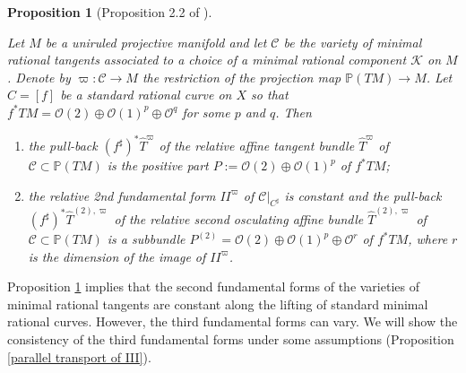 \documentclass[12pt]{amsart}
\theoremstyle{plain}
\newtheorem{proposition}[theorem]{Proposition}
\theoremstyle{definition}
\begin{document}
\begin{proposition} [Proposition 2.2 of \cite{Mk08}] \label{parallel transport of II}

Let $M$ be a uniruled projective manifold and let  $ \mathcal C$ be the variety of minimal rational tangents associated to a choice of a minimal rational component $\mathcal K$ on $M$. Denote by $\varpi: \mathcal C \rightarrow M$   the restriction of the projection map $\mathbb P(TM) \rightarrow M$.
Let $C=[f]$ be a standard rational curve on $X$ so that $f^*TM =\mathcal O(2) \oplus \mathcal O(1)^p \oplus \mathcal O^q$ for some $p$ and $q$.
Then
\begin{enumerate}
\item the pull-back $(f^{\sharp})^*\widehat{T}^{\varpi} $ of the relative affine tangent bundle $ \widehat{T}^{\varpi} $ of $\mathcal C \subset \mathbb P(TM)$ is the positive part $ P:=\mathcal O(2) \oplus \mathcal O(1)^p$ of $f^*TM$;
\item the relative 2nd fundamental form $II^{\varpi}$ of $\mathcal C|_{C^{\sharp}}$ is constant and  the pull-back $(f^{\sharp})^*\widehat{T}^{(2), \varpi} $ of the relative  second osculating affine   bundle   $ \widehat{T}^{(2), \varpi} $ of $\mathcal C \subset \mathbb P(TM)$  is a subbundle  $P^{(2)} =\mathcal O(2) \oplus \mathcal O(1)^p \oplus \mathcal O^r$ of $f^*TM$, where $r$ is the dimension of the image of $II^{\varpi}$.

\end{enumerate}

\end{proposition}

Proposition \ref{parallel transport of II} implies that the second fundamental forms of the varieties of minimal rational tangents are constant along the lifting of standard minimal rational curves. However, the third fundamental forms can vary. We will show the consistency of the third fundamental forms under some assumptions  (Proposition \ref{parallel transport of III}).
\end{document}
